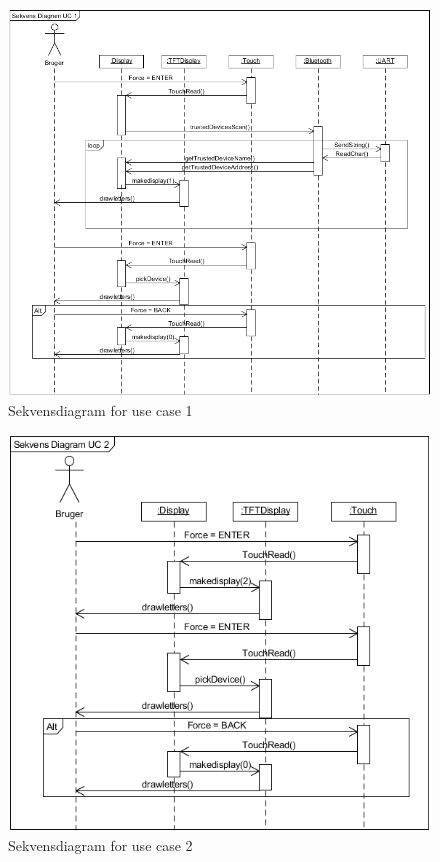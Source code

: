 \begin{figure}[H]
	\centering
	\includegraphics[width = 400 pt]{Img/SD1.png}
	\caption{Sekvensdiagram for use case 1}
	\label{fig:SD1}
\end{figure}
\begin{figure}[H]
	\centering
	\includegraphics[width = 400 pt]{Img/SD2.png}
	\caption{Sekvensdiagram for use case 2}
	\label{fig:SD2}
\end{figure}

